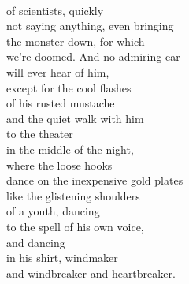 \documentclass[smalldemyvopaper,11pt,twoside,onecolumn,openright,extrafontsizes]{memoir}
\begin{document}
\\of scientists, quickly
\\not saying anything, even bringing
\\the monster down, for which
\\we're doomed. And no admiring ear
\\will ever hear of him,
\\except for the cool flashes
\\of his rusted mustache
\\and the quiet walk with him
\\to the theater
\\in the middle of the night,
\\where the loose hooks
\\dance on the inexpensive gold plates
\\like the glistening shoulders
\\of a youth, dancing
\\to the spell of his own voice,
\\and dancing
\\in his shirt, windmaker
\\and windbreaker and heartbreaker.
\end{document}
